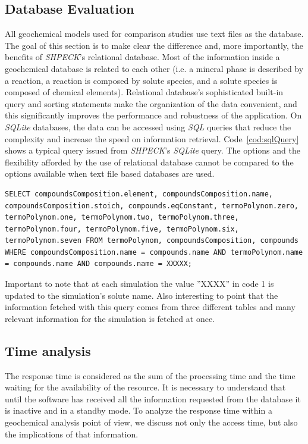 \documentclass[preprint,12pt,3p]{elsarticle}
\begin{document}
\subsection{Database Evaluation}
All geochemical models used for comparison studies use text files as the database. The goal of this section is to make clear the difference and, more importantly, the benefits of \emph{SHPECK}’s relational database. Most of the information inside a geochemical database is related to each other (i.e. a mineral phase is described by a reaction, a reaction is composed by solute species, and a solute species is composed of chemical elements). Relational database’s sophisticated built-in query and sorting statements make the organization of the data convenient, and this significantly improves the performance and robustness of the application. On \emph{SQLite} databases, the data can be accessed using \emph{SQL} queries that reduce the complexity and increase the speed on information retrieval. Code~\ref{cod:sqlQuery} shows a typical query issued from \emph{SHPECK}’s \emph{SQLite} query. The options and the flexibility afforded by the use of relational database cannot be compared to the options available when text file based databases are used.

\begin{minipage}{0.8\linewidth}
\begin{lstlisting}[frame=single, label=cod:sqlQuery, caption=\emph{SHPECK}'s \emph{SQLite} example query]
SELECT compoundsComposition.element, compoundsComposition.name, compoundsComposition.stoich, compounds.eqConstant, termoPolynom.zero, termoPolynom.one, termoPolynom.two, termoPolynom.three, termoPolynom.four, termoPolynom.five, termoPolynom.six, termoPolynom.seven FROM termoPolynom, compoundsComposition, compounds WHERE compoundsComposition.name = compounds.name AND termoPolynom.name = compounds.name AND compounds.name = XXXXX;
\end{lstlisting}
\end{minipage}

Important to note that at each simulation the value ”XXXX” in code 1 is updated to the simulation’s solute name. Also interesting to point that the information fetched with this query comes from three different tables and many relevant information for the simulation is fetched at once.

\subsection{Time analysis}
The response time is considered as the sum of the processing time and the time waiting for the availability of the resource. It is necessary to understand that until the software has received all the information requested from the database it is inactive and in a standby mode. To analyze the response time within a geochemical analysis point of view, we discuss not only the access time, but also the implications of that information.
\end{document}
